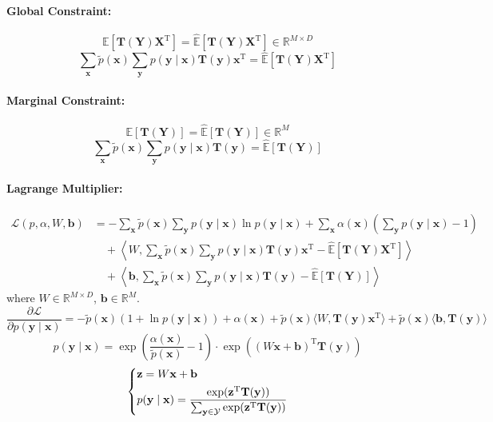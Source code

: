\documentclass{article}
\begin{document}
\paragraph{Global Constraint:}
\[
    \mathbb{E}[\mathbf{T}(\mathbf{Y})\mathbf{X}^{\mathrm{T}}] = \hat{\mathbb{E}}[\mathbf{T}(\mathbf{Y})\mathbf{X}^{\mathrm{T}}] \in \mathbb{R}^{M \times D}
\]
\[
    \sum_\mathbf{x} \tilde{p}(\mathbf{x}) \sum_{\mathbf{y}} p(\mathbf{y} \mid \mathbf{x}) \mathbf{T}(\mathbf{y})\mathbf{x}^{\mathrm{T}} = \hat{\mathbb{E}}[\mathbf{T}(\mathbf{Y})\mathbf{X}^{\mathrm{T}}]
\]
\paragraph{Marginal Constraint:}
\[
    \mathbb{E}[\mathbf{T}(\mathbf{Y})] = \hat{\mathbb{E}}[\mathbf{T}(\mathbf{Y})] \in \mathbb{R}^M
\]
\[
    \sum_\mathbf{x} \tilde{p}(\mathbf{x}) \sum_{\mathbf{y}} p(\mathbf{y} \mid \mathbf{x}) \mathbf{T}(\mathbf{y}) = \hat{\mathbb{E}}[\mathbf{T}(\mathbf{Y})]
\]
\paragraph{Lagrange Multiplier:}
\begin{align*}
    \mathcal{L}(p, \alpha, W, \mathbf{b}) &= - \sum_\mathbf{x} \tilde{p}(\mathbf{x}) \sum_{\mathbf{y}} p(\mathbf{y} \mid \mathbf{x}) \ln p(\mathbf{y} \mid \mathbf{x}) + \sum_\mathbf{x} \alpha(\mathbf{x}) \left(\sum_{\mathbf{y}} p(\mathbf{y} \mid \mathbf{x}) - 1\right) \\
    &\quad + \left\langle W, \sum_\mathbf{x} \tilde{p}(\mathbf{x}) \sum_{\mathbf{y}} p(\mathbf{y} \mid \mathbf{x}) \mathbf{T}(\mathbf{y})\mathbf{x}^{\mathrm{T}} - \hat{\mathbb{E}}[\mathbf{T}(\mathbf{Y})\mathbf{X}^{\mathrm{T}}] \right\rangle \\
    &\quad + \left\langle \mathbf{b}, \sum_\mathbf{x} \tilde{p}(\mathbf{x}) \sum_{\mathbf{y}} p(\mathbf{y} \mid \mathbf{x}) \mathbf{T}(\mathbf{y}) - \hat{\mathbb{E}}[\mathbf{T}(\mathbf{Y})] \right\rangle
\end{align*}
where $W \in \mathbb{R}^{M \times D}$, $\mathbf{b} \in \mathbb{R}^M$.
\[
    \frac{\partial \mathcal{L}}{\partial p(\mathbf{y} \mid \mathbf{x})} = - \tilde{p}(\mathbf{x}) (1 + \ln p(\mathbf{y} \mid \mathbf{x})) + \alpha(\mathbf{x}) + \tilde{p}(\mathbf{x}) \langle W, \mathbf{T}(\mathbf{y})\mathbf{x}^{\mathrm{T}} \rangle + \tilde{p}(\mathbf{x}) \langle \mathbf{b}, \mathbf{T}(\mathbf{y}) \rangle
\]
\[
    p(\mathbf{y} \mid \mathbf{x}) = \exp\left(\frac{\alpha(\mathbf{x})}{\tilde{p}(\mathbf{x})} - 1\right) \cdot \exp((W\mathbf{x}+\mathbf{b})^{\mathrm{T}} \mathbf{T}(\mathbf{y}))
\]
\[
    \begin{dcases}
        \mathbf{z} = W\mathbf{x}+\mathbf{b} \\
        p(\mathbf{y} \mid \mathbf{x}) = \frac{\exp(\mathbf{z}^{\mathrm{T}} \mathbf{T}(\mathbf{y}))}{\sum_{\mathbf{y} \in \mathcal{Y}} \exp(\mathbf{z}^{\mathrm{T}} \mathbf{T}(\mathbf{y}))}
    \end{dcases}
\]
\end{document}
